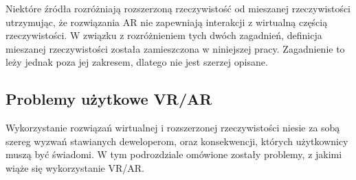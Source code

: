 \documentclass[a4paper,11pt,twoside]{report}
\theoremstyle{definition}
\begin{document}
Niektóre źródła\cite{ARMRdifferences} rozróżniają rozszerzoną rzeczywistość od mieszanej rzeczywistości utrzymując, że rozwiązania AR nie zapewniają interakcji z wirtualną częścią rzeczywistości. W związku z rozróżnieniem tych dwóch zagadnień, definicja mieszanej rzeczywistości została zamieszczona w niniejszej pracy. Zagadnienie to leży jednak poza jej zakresem, dlatego nie jest szerzej opisane. 

\subsection{Problemy użytkowe VR/AR}

Wykorzystanie rozwiązań wirtualnej i rozszerzonej rzeczywistości niesie za sobą szereg wyzwań stawianych deweloperom, oraz konsekwencji, których użytkownicy muszą być świadomi. W tym podrozdziale omówione zostały problemy, z jakimi wiąże się wykorzystanie VR/AR\cite{VRdifficulties}.
\end{document}
